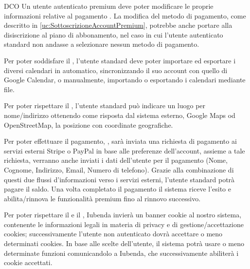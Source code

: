 \begin{listaPersonale}{DCO}
    Un utente autenticato premium deve poter modificare le proprie informazioni relative al pagamento . La modifica del metodo di pagamento, come descritto in \ref{uc:SottoscrizioneAccountPremium}, potrebbe anche portare alla disiscrizione al piano di abbonamento, nel caso in cui l'utente autenticato standard non andasse a selezionare nessun metodo di pagamento.

    Per poter soddisfare il , l'utente standard deve poter importare ed esportare i diversi calendari in automatico, sincronizzando il suo account con quello di Google Calendar, o manualmente, importando o esportando i calendari mediante file.

    Per poter rispettare il , l'utente standard può indicare un luogo per nome/indirizzo ottenendo come risposta dal sistema esterno, Google Maps od OpenStreetMap, la posizione con coordinate geografiche.

    Per poter effettuare il pagamento, , sarà inviata una richiesta di pagamento ai servizi esterni Stripe o PayPal in base alle preferenze dell'account, assieme a tale richiesta, verranno anche inviati i dati dell'utente per il pagamento (Nome, Cognome, Indirizzo, Email, Numero di telefono). Grazie alla combinazione di questi due flussi d'informazioni verso i servizi esterni, l'utente standard potrà pagare il saldo. Una volta completato il pagamento il sistema riceve l'esito e abilita/rinnova le funzionalità premium fino al rinnovo successivo.

    Per poter rispettare il  e il , Iubenda invierà un banner cookie al nostro sistema, contenente le informazioni legali in materia di privacy e di gestione/accettazione cookies; successivamente l'utente non autenticato dovrà accettare o meno determinati cookies. In base alle scelte dell'utente, il sistema potrà usare o meno determinate funzioni comunicandolo a Iubenda, che successivamente abiliterà i cookie accettati.
    \begin{comment}
    \elemento[Posta elettronica]{dco:PostaElettronica}
    Per poter rispettare il \prettyref{D1-rf:RecuperoPassword}, il sistema invierà una richiesta di email di recupero password a un sistema di posta elettronica che provvederà all'invio dell' email di recupero all'utente. %
    \end{comment}


\end{listaPersonale}
